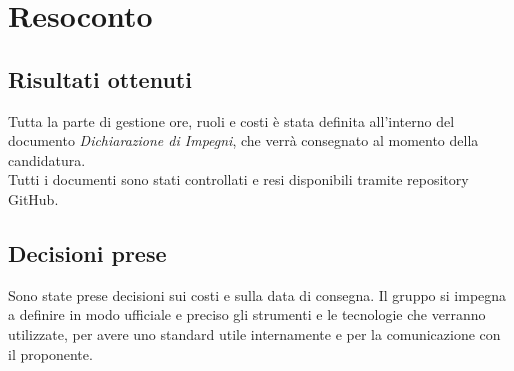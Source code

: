 \section{Resoconto}

\subsection{Risultati ottenuti}
Tutta la parte di gestione ore, ruoli e costi è stata definita all'interno del documento \textit{Dichiarazione di Impegni}, che verrà consegnato al momento della candidatura.\\
Tutti i documenti sono stati controllati e resi disponibili tramite repository GitHub.

\subsection{Decisioni prese}
Sono state prese decisioni sui costi e sulla data di consegna. Il gruppo si impegna a definire in modo ufficiale e preciso gli strumenti e le tecnologie che verranno utilizzate, per avere uno standard utile internamente e per la comunicazione con il proponente.